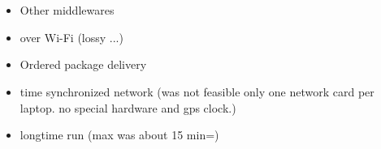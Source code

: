 \chapter{}
\label{sec:conclusion_and_outlook}
\begin{itemize}
    \item Other middlewares
    \item over Wi-Fi (lossy ...)
    \item Ordered package delivery
    \item time synchronized network (was not feasible only one network card per laptop. no special hardware and gps clock.)
    \item longtime run (max was about 15 min=)
\end{itemize}